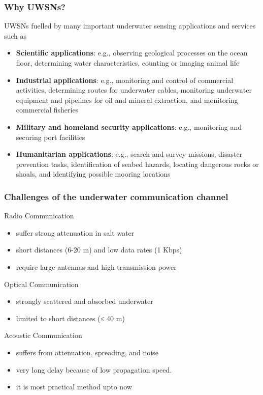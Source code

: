 \documentclass{beamer}
\begin{document}
\begin{frame}
\frametitle{Why UWSNs?}
UWSNs fuelled by many important underwater sensing applications and services such as

\begin{itemize}
\item \textbf{Scientific applications}: e.g., observing  geological processes on the ocean floor, determining water characteristics, counting or imaging animal life
\item \textbf{Industrial applications}: e.g., monitoring and control of commercial activities, determining routes for underwater cables, monitoring underwater equipment  and pipelines for oil and mineral extraction, and monitoring commercial fisheries
\item \textbf{Military and homeland security applications}: e.g., monitoring and securing port facilities

\item \textbf{Humanitarian applications}: e.g., search and survey missions, disaster prevention tasks, identification of seabed hazards, locating dangerous rocks or shoals, and identifying possible mooring locations
\end{itemize}
\end{frame}


\begin{frame}

\frametitle{Challenges of the underwater communication channel}
\begin{block}{Radio Communication}
\begin{itemize}
\item suffer strong attenuation in salt water
\item short distances (6-20 m) and low data rates (1 Kbps)
\item require large antennas and high transmission power
\end{itemize}
\end{block}

\begin{block}{Optical Communication}
\begin{itemize}
\item strongly scattered and absorbed underwater
\item  limited to short distances (≤ 40 m)
\end{itemize}
\end{block}

\begin{block}{Acoustic Communication}
\begin{itemize}
\item suffers from attenuation, spreading, and noise 
\item very long delay because of low propagation speed.
\item it is most practical method upto now 
\end{itemize}
\end{block}
\end{frame}
\end{document}
